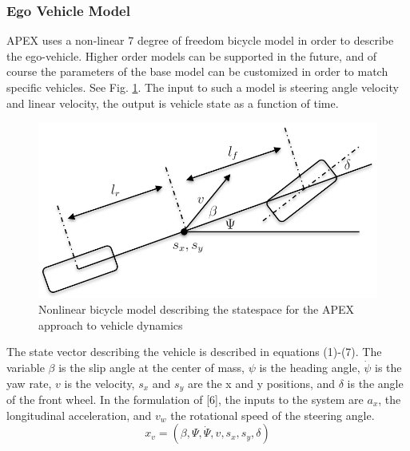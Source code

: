 \subsubsection{Ego Vehicle Model}
APEX uses a non-linear 7 degree of freedom bicycle model \cite{Rajamani2011} in order to describe the ego-vehicle. 
Higher order models can be supported in the future, and of course the parameters of the base model can be customized in order to match specific vehicles. 
See Fig. \ref{fig:bike}. 
The input to such a model is steering angle velocity and linear velocity, the output is vehicle state as a function of time. 

\begin{figure}[b]
	\centering
	\includegraphics[scale=.6]{figures/bicycle_model.png}
	\caption{Nonlinear bicycle model describing the statespace for the APEX approach to vehicle dynamics}
	\label{fig:bike}
\end{figure}

The state vector describing the vehicle is described in equations (1)-(7). 
The variable \(\beta\) is the slip angle at the center of mass, \(\psi\) is the heading angle, \(\dot{\psi}\) is the yaw rate, \(v\) is the velocity, \(s_x\) and \(s_y\) are the x and y positions, and \(\delta\) is the angle of the front wheel. In the formulation of [6], the inputs to the system are \(a_x\), the longitudinal acceleration, and \(v_w\) the rotational speed of the steering angle. 
\begin{equation}
	x_v = (\beta,\Psi,\dot{\Psi}, v, s_x, s_y, \delta)
\end{equation}	

